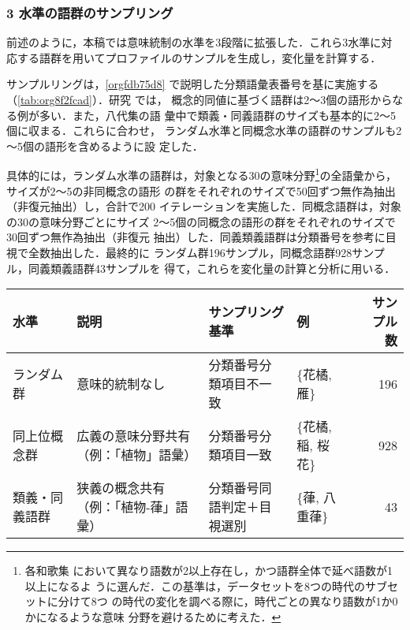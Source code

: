 \documentclass[submit]{ipsj}
\renewcommand{\ref}{\cref}
\begin{document}
\subsubsection{3 水準の語群のサンプリング\label{org8975952}}
\label{sec:org1618d90}
前述のように，本稿では意味統制の水準を3段階に拡張した．これら3水準に対
応する語群を用いてプロファイルのサンプルを生成し，変化量を計算する．

サンプルリングは，\ref{orgfdb75d8} で説明した分類語彙表番号を基に実施する
（\ref{tab:org8f2fcad}）．研究 \cite{Speelman2003Profilebased} では，
概念的同値に基づく語群は2～3個の語形からなる例が多い．また，八代集の語
彙中で類義・同義語群のサイズも基本的に2～5個に収まる．これらに合わせ，
ランダム水準と同概念水準の語群のサンプルも2～5個の語形を含めるように設
定した．

具体的には，ランダム水準の語群は，対象となる30の意味分野\footnote{各和歌集
において異なり語数が2以上存在し，かつ語群全体で延べ語数が1以上になるよ
うに選んだ．この基準は，データセットを8つの時代のサブセットに分けて8つ
の時代の変化を調べる際に，時代ごとの異なり語数が1か0かになるような意味
分野を避けるために考えた．}の全語彙から，サイズが2～5の非同概念の語形
の群をそれぞれのサイズで50回ずつ無作為抽出（非復元抽出）し，合計で200
イテレーションを実施した．同概念語群は，対象の30の意味分野ごとにサイズ
2～5個の同概念の語形の群をそれぞれのサイズで30回ずつ無作為抽出（非復元
抽出）した．同義類義語群は分類番号を参考に目視で全数抽出した．最終的に
ランダム群196サンプル，同概念語群928サンプル，同義類義語群43サンプルを
得て，これらを変化量の計算と分析に用いる．

\begin{table*}[tb]
\caption{\label{tab:org8f2fcad}3水準の語形集合のサンプル例}
\centering
\begin{tabular}{llllr}
水準 & 説明 & サンプリング基準 & 例 & サンプル数\\
\hline
ランダム群 & 意味的統制なし & 分類番号分類項目不一致 & \{花橘, 雁\} & 196\\
同上位概念群 & 広義の意味分野共有（例：「植物」語彙） & 分類番号分類項目一致 & \{花橘, 稲, 桜花\} & 928\\
類義・同義語群 & 狭義の概念共有（例：「植物-葎」語彙） & 分類番号同語判定＋目視選別 & \{葎, 八重葎\} & 43\\
\end{tabular}
\end{table*}
\end{document}
